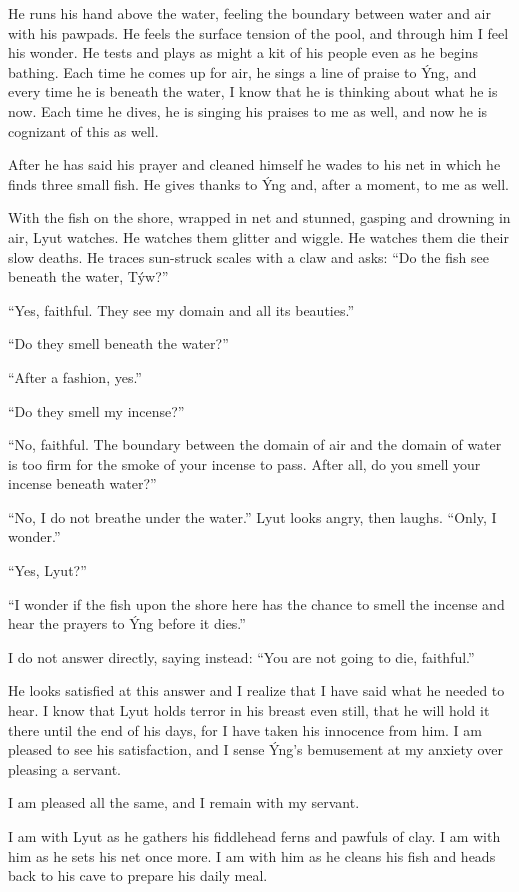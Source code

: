 He runs his hand above the water, feeling the boundary between water and air with his pawpads. He feels the surface tension of the pool, and through him I feel his wonder. He tests and plays as might a kit of his people even as he begins bathing. Each time he comes up for air, he sings a line of praise to Ýng, and every time he is beneath the water, I know that he is thinking about what he is now. Each time he dives, he is singing his praises to me as well, and now he is cognizant of this as well.

After he has said his prayer and cleaned himself he wades to his net in which he finds three small fish. He gives thanks to Ýng and, after a moment, to me as well.

With the fish on the shore, wrapped in net and stunned, gasping and drowning in air, Lyut watches. He watches them glitter and wiggle. He watches them die their slow deaths. He traces sun-struck scales with a claw and asks: ``Do the fish see beneath the water, Týw?''

``Yes, faithful. They see my domain and all its beauties.''

``Do they smell beneath the water?''

``After a fashion, yes.''

``Do they smell my incense?''

``No, faithful. The boundary between the domain of air and the domain of water is too firm for the smoke of your incense to pass. After all, do you smell your incense beneath water?''

``No, I do not breathe under the water.'' Lyut looks angry, then laughs. ``Only, I wonder.''

``Yes, Lyut?''

``I wonder if the fish upon the shore here has the chance to smell the incense and hear the prayers to Ýng before it dies.''

I do not answer directly, saying instead: ``You are not going to die, faithful.''

He looks satisfied at this answer and I realize that I have said what he needed to hear. I know that Lyut holds terror in his breast even still, that he will hold it there until the end of his days, for I have taken his innocence from him. I am pleased to see his satisfaction, and I sense Ýng's bemusement at my anxiety over pleasing a servant.

I am pleased all the same, and I remain with my servant.

I am with Lyut as he gathers his fiddlehead ferns and pawfuls of clay. I am with him as he sets his net once more. I am with him as he cleans his fish and heads back to his cave to prepare his daily meal.

